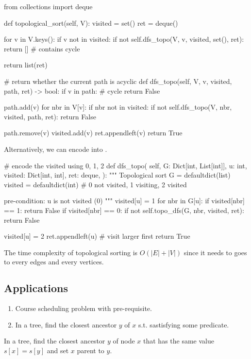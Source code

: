 \begin{python}
from collections import deque

def topological_sort(self, V):
  visited = set()
  ret = deque()

  for v in V.keys():
    if v not in visited:
      if not self.dfs_topo(V, v, visited, set(), ret):
        return []  # contains cycle

  return list(ret)

# return whether the current path is acyclic
def dfs_topo(self, V, v, visited, path, ret) -> bool:
  if v in path:  # cycle
    return False

  path.add(v)
  for nbr in V[v]:
    if nbr not in visited:
      if not self.dfs_topo(V, nbr, visited, path, ret):
        return False

  path.remove(v)
  visited.add(v)
  ret.appendleft(v)
  return True
\end{python}
Alternatively, we can encode  into . 
\begin{python}
# encode the visited using 0, 1, 2
def dfs_topo(
  self, 
  G: Dict[int, List[int]], 
  u: int, 
  visited: Dict[int, int],
  ret: deque,
):
  """
  Topological sort
  G = defaultdict(list)
  visited = defaultdict(int) 
  # 0 not visited, 1 visiting, 2 visited

  pre-condition: u is not visited (0)
  """
  visited[u] = 1
  for nbr in G[u]:
    if visited[nbr] == 1:
      return False
    if visited[nbr] == 0:
      if not self.topo_dfs(G, nbr, visited, ret):
        return False

  visited[u] = 2
  ret.appendleft(u)  # visit larger first
  return True
\end{python}
The time complexity of topological sorting is $O(|E|+|V|)$ since it needs to goes to every edges and every vertices. 

\subsection{Applications}
\begin{enumerate}
\item Course scheduling problem with pre-requisite.
\item In a tree, find the closest ancestor $y$ of $x$ s.t. sastisfying some predicate. 
\end{enumerate}

In a tree, find the closest ancestor $y$ of node $x$ that has the same value $s[x] = s[y]$ and set $x$ parent to $y$. 

